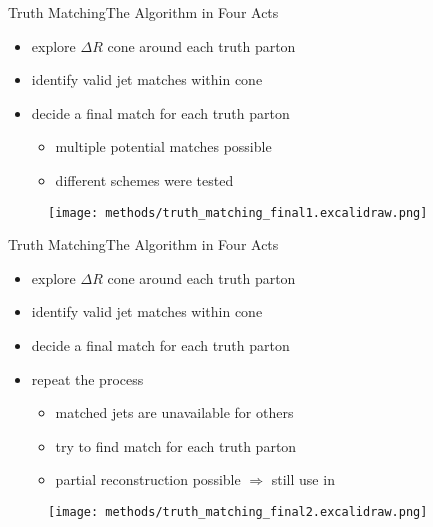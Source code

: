 \documentclass[9pt, aspectratio=169]{beamer}
\begin{document}
\addtocounter{framenumber}{-1} 

\begin{frame}{Truth Matching}{The Algorithm in Four Acts}
	\begin{minipage}{.60\textwidth}
		\begin{itemize}
			\item explore $\Delta R$ cone around each truth parton 
			\item identify valid jet matches within cone
			\item decide a final match for each truth parton 
			\begin{itemize}
				\item multiple potential matches possible
				\item different schemes were tested
			\end{itemize}
		\end{itemize}
	\end{minipage}\hfill
	\begin{minipage}{.38\textwidth}
		\begin{figure}
			\centering
			\texttt{[image: methods/truth\_matching\_final1.excalidraw.png]}
		\end{figure}
	\end{minipage}
\end{frame}

\addtocounter{framenumber}{-1} 

\begin{frame}{Truth Matching}{The Algorithm in Four Acts}
	\begin{minipage}{.60\textwidth}
		\begin{itemize}
			\item explore $\Delta R$ cone around each truth parton 
			\item identify valid jet matches within cone
			\item decide a final match for each truth parton 
			\item repeat the process
			\begin{itemize}
				\item matched jets are unavailable for others
				\item try to find match for each truth parton
				\item partial reconstruction possible $\Rightarrow$ still use in \spanet
			\end{itemize}
		\end{itemize}
	\end{minipage}\hfill
	\begin{minipage}{.38\textwidth}
		\begin{figure}
			\centering
			\texttt{[image: methods/truth\_matching\_final2.excalidraw.png]}
		\end{figure}
	\end{minipage}
\end{frame}
\end{document}
